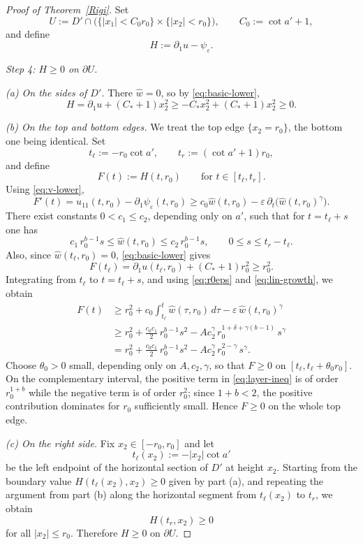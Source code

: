 \documentclass[10pt,a4paper]{amsart}
\begin{document}
\begin{proof}[Proof of Theorem~\ref{Rigi}]
Set
\[
U:=D'\cap\bigl(\{|x_1|<C_0r_0\}\times \{|x_2|<r_0\}\bigr),
\qquad
C_0:=\cot a'+1,
\]
and define
\[
H:=\partial_1u-\psi_\varepsilon.
\]

\medskip
\noindent\textit{Step 4: $H\ge0$ on $\partial U$.}

\smallskip
\noindent\emph{(a) On the sides of $D'$.}
There $\hat w=0$, so by \eqref{eq:basic-lower},
\[
H=\partial_1u+(C_\ast+1)x_2^2
\ge -C_\ast x_2^2+(C_\ast+1)x_2^2
\ge0.
\]

\smallskip
\noindent\emph{(b) On the top and bottom edges.}
We treat the top edge $\{x_2=r_0\}$, the bottom one being identical.
Set
\[
t_\ell:=-r_0\cot a',
\qquad
t_r:=(\cot a'+1)r_0,
\]
and define
\[
F(t):=H(t,r_0)
\qquad\text{for }t\in[t_\ell,t_r].
\]
Using \eqref{eq:v-lower},
\[
F'(t)
=
u_{11}(t,r_0)-\partial_1\psi_\varepsilon(t,r_0)
\ge c_0\hat w(t,r_0)-\varepsilon\,\partial_t\bigl(\hat w(t,r_0)^\gamma\bigr).
\]
There exist constants $0<c_1\le c_2$, depending only on $a'$, such that
for $t=t_\ell+s$ one has
\begin{equation}\label{eq:lin-growth}
c_1\,r_0^{b-1}s\le \hat w(t,r_0)\le c_2\,r_0^{b-1}s,
\qquad 0\le s\le t_r-t_\ell.
\end{equation}
Also, since $\hat w(t_\ell,r_0)=0$, \eqref{eq:basic-lower} gives
\[
F(t_\ell)=\partial_1u(t_\ell,r_0)+(C_\ast+1)r_0^2\ge r_0^2.
\]
Integrating from $t_\ell$ to $t=t_\ell+s$, and using \eqref{eq:r0eps} and \eqref{eq:lin-growth},
we obtain
\begin{align}
F(t)
&\ge r_0^2 + c_0\int_{t_\ell}^{t}\hat w(\tau,r_0)\,d\tau
-\varepsilon\,\hat w(t,r_0)^\gamma \nonumber\\
&\ge r_0^2+\frac{c_0c_1}{2}\,r_0^{b-1}s^2
-Ac_2^\gamma\,r_0^{1+\delta+\gamma(b-1)}\,s^\gamma \nonumber\\
&= r_0^2+\frac{c_0c_1}{2}\,r_0^{b-1}s^2
-Ac_2^\gamma\,r_0^{2-\gamma}\,s^\gamma. \label{eq:layer-ineq}
\end{align}
Choose $\theta_0>0$ small, depending only on $A,c_2,\gamma$, so that
$F\ge0$ on $[t_\ell,t_\ell+\theta_0r_0]$.
On the complementary interval, the positive term in \eqref{eq:layer-ineq}
is of order $r_0^{1+b}$ while the negative term is of order $r_0^2$;
since $1+b<2$, the positive contribution dominates for $r_0$ sufficiently small.
Hence $F\ge0$ on the whole top edge.

\smallskip
\noindent\emph{(c) On the right side.}
Fix $x_2\in[-r_0,r_0]$ and let
\[
t_\ell(x_2):=-|x_2|\cot a'
\]
be the left endpoint of the horizontal section of $D'$ at height $x_2$.
Starting from the boundary value $H(t_\ell(x_2),x_2)\ge0$ given by part (a), and repeating
the argument from part (b) along the horizontal segment from $t_\ell(x_2)$ to $t_r$, we obtain
\[
H(t_r,x_2)\ge0
\]
for all $|x_2|\le r_0$.
Therefore $H\ge0$ on $\partial U$.


\end{proof}
\end{document}
